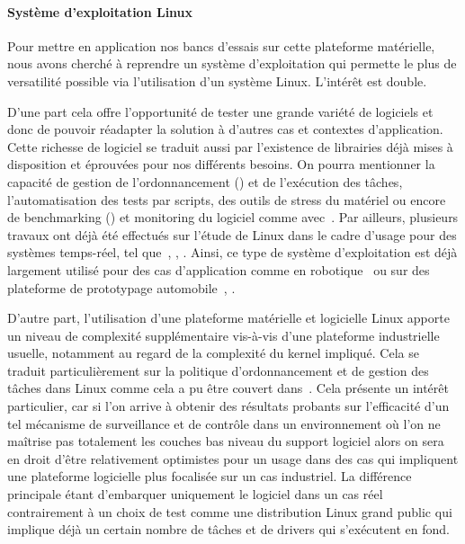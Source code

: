 \documentclass[french, a4paper, 11pt, twoside, pdftex]{StyleThese}
\begin{document}
        \paragraph{Système d'exploitation Linux}
        Pour mettre en application nos bancs d'essais sur cette plateforme matérielle, nous avons cherché à reprendre un système d'exploitation qui permette le plus de versatilité possible via l'utilisation d'un système Linux. L'intérêt est double. 
        
        D'une part cela offre l'opportunité de tester une grande variété de logiciels et donc de pouvoir réadapter la solution à d'autres cas et contextes d'application. Cette richesse de logiciel se traduit aussi par l'existence de librairies déjà mises à disposition et éprouvées pour nos différents besoins. On pourra mentionner la capacité de gestion de l'ordonnancement (\cite{ishkov_complete_2015}) et de l'exécution des tâches, l'automatisation des tests par scripts, des outils de stress du matériel ou encore de benchmarking (\cite{king_stress-ng_2019}) et monitoring du logiciel comme avec~\cite{girbal_metrics_2018}. Par ailleurs, plusieurs travaux ont déjà été effectués sur l'étude de Linux dans le cadre d'usage pour des systèmes temps-réel, tel que~\cite{gerum_xenomai_2004}, \cite{litayem_building_2011}, \cite{allende_towards_2019}. Ainsi, ce type de système d'exploitation est déjà largement utilisé pour des cas d'application comme en robotique~\cite{bouchier_embedded_2013} ou sur des plateforme de prototypage automobile~\cite{sivakumar_automotive_2020}, \cite{gobillot_esprit_2018}.
        
        D'autre part, l'utilisation d'une plateforme matérielle et logicielle Linux apporte un niveau de complexité supplémentaire vis-à-vis d'une plateforme industrielle usuelle, notamment au regard de la complexité du kernel impliqué. Cela se traduit particulièrement sur la politique d'ordonnancement et de gestion des tâches dans Linux comme cela a pu être couvert dans~\cite{lozi_linux_2016}. Cela présente un intérêt particulier, car si l'on arrive à obtenir des résultats probants sur l'efficacité d'un tel mécanisme de surveillance et de contrôle dans un environnement où l'on ne maîtrise pas totalement les couches bas niveau du support logiciel alors on sera en droit d'être relativement optimistes pour un usage dans des cas qui impliquent une plateforme logicielle plus focalisée sur un cas industriel. La différence principale étant d'embarquer uniquement le logiciel dans un cas réel contrairement à un choix de test comme une distribution Linux grand public qui implique déjà un certain nombre de tâches et de drivers qui s'exécutent en fond. 
        
\end{document}

